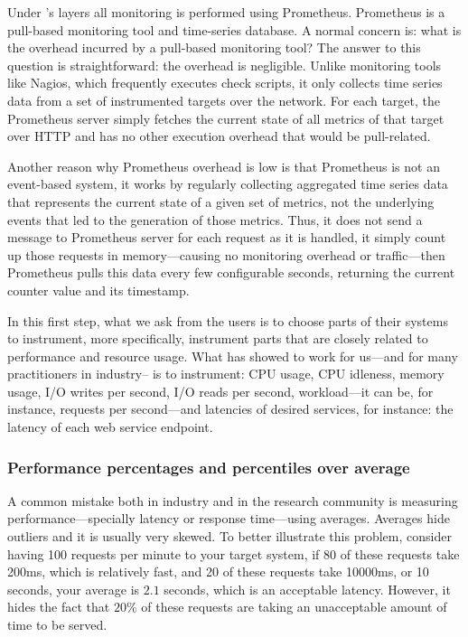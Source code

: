Under \projectname{}'s layers all monitoring is performed using Prometheus. Prometheus is a pull-based monitoring tool and time-series database. A normal concern is: what is the overhead incurred by a pull-based monitoring tool? The answer to this question is straightforward: the overhead is negligible. Unlike monitoring tools like Nagios, which frequently executes check scripts, it only collects time series data from a set of instrumented targets over the network. For each target, the Prometheus server simply fetches the current state of all metrics of that target over HTTP and has no other execution overhead that would be pull-related.

Another reason why Prometheus overhead is low is that Prometheus is not an event-based system, it works by regularly collecting aggregated time series data that represents the current state of a given set of metrics, not the underlying events that led to the generation of those metrics. Thus, it does not send a message to Prometheus server for each request as it is handled, it simply count up those requests in memory---causing no monitoring overhead or traffic---then Prometheus pulls this data every few configurable seconds, returning the current counter value and its timestamp.

In this first step, what we ask from the users is to choose parts of their systems to instrument, more specifically, instrument parts that are closely related to performance and resource usage. What has showed to work for us---and for many practitioners in industry-- is to instrument: CPU usage, CPU idleness, memory usage, I/O writes per second, I/O reads per second, workload---it can be, for instance, requests per second---and latencies of desired services, for instance: the latency of each web service endpoint.

\subsubsection{Performance percentages and percentiles over average}

A common mistake both in industry and in the research community is measuring performance---specially latency or response time---using averages. Averages hide outliers and it is usually very skewed. To better illustrate this problem, consider having 100 requests per minute to your target system, if 80 of these requests take 200ms, which is relatively fast, and 20 of these requests take 10000ms, or 10 seconds, your average is $2.1$ seconds, which is an acceptable latency. However, it hides the fact that $20\%$ of these requests are taking an unacceptable amount of time to be served.

